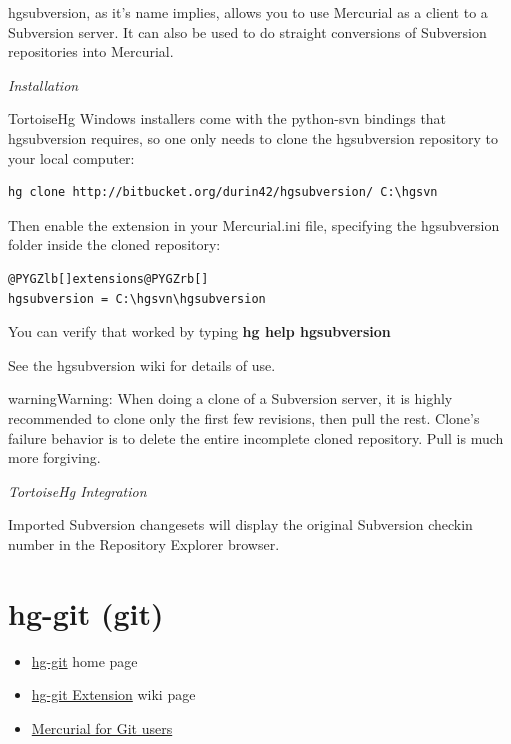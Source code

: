 \documentclass[letterpaper,10pt,english]{manual}
\begin{document}
hgsubversion, as it's name implies, allows you to use Mercurial as a
client to a Subversion server.  It can also be used to do straight
conversions of Subversion repositories into Mercurial.

\emph{Installation}

TortoiseHg Windows installers come with the python-svn bindings that
hgsubversion requires, so one only needs to clone the hgsubversion
repository to your local computer:

\begin{Verbatim}[commandchars=@\[\]]
hg clone http://bitbucket.org/durin42/hgsubversion/ C:\hgsvn
\end{Verbatim}

Then enable the extension in your Mercurial.ini file, specifying the
hgsubversion folder inside the cloned repository:

\begin{Verbatim}[commandchars=@\[\]]
@PYGZlb[]extensions@PYGZrb[]
hgsubversion = C:\hgsvn\hgsubversion
\end{Verbatim}

You can verify that worked by typing \textbf{hg help hgsubversion}

See the hgsubversion wiki for details of use.

\begin{notice}{warning}{Warning:}
When doing a clone of a Subversion server, it is highly recommended
to clone only the first few revisions, then pull the rest.  Clone's
failure behavior is to delete the entire incomplete cloned
repository.  Pull is much more forgiving.
\end{notice}

\emph{TortoiseHg Integration}

Imported Subversion changesets will display the original Subversion
checkin number in the Repository Explorer browser.


\section{hg-git (git)}
\begin{itemize}
\item {} 
\href{http://hg-git.github.com/}{hg-git} home page

\item {} 
\href{http://mercurial.selenic.com/wiki/HgGit}{hg-git Extension} wiki page

\item {} 
\href{http://mercurial.selenic.com/wiki/GitConcepts}{Mercurial for Git users}

\end{itemize}
\end{document}
